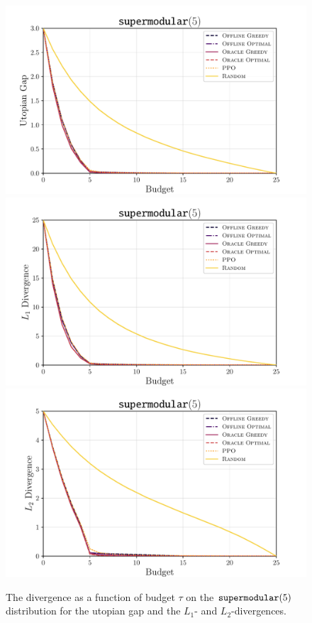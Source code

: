 \begin{figure}[t!]
  \centering
	\includegraphics[width=\stdfigwidth]{figures/exploitability_convex5.pdf}
	\includegraphics[width=\stdfigwidth]{figures/l1_norm_convex5.pdf}
	\includegraphics[width=\stdfigwidth]{figures/l2_norm_convex5.pdf}
	\caption{ The divergence as a function of budget $ \tau $ on the $ \supermodular[5] $ distribution for the utopian gap \citep[][Figure 1]{uradnik2024reducing} and the $ L_1 $- and $ L_2 $-divergences.}
	\label{fig:supermodular}
\end{figure}

